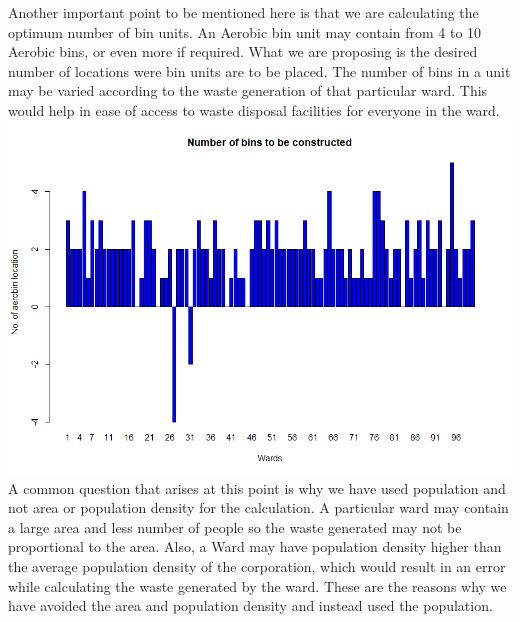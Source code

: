 \documentclass[12pt,a4paper]{  report}
\begin{document}
\begin{justify}
	Another important point to be mentioned here is that we are calculating the optimum number of bin units. An Aerobic bin unit may contain from 4 to 10 Aerobic bins, or even more if required. What we are proposing is the desired number of locations were bin units are to be placed. The number of bins in a unit may be varied according to the waste generation of that particular ward. This would help in ease of access to waste disposal facilities for everyone in the ward.
	\includegraphics[width=1\textwidth]{construc}
	A common question that arises at this point is why we have used population and not area or population density for the calculation. A particular ward may contain a large area and less number of people so the waste generated may not be proportional to the area. Also, a Ward may have population density higher than the average population density of the corporation, which would result in an error while calculating the waste generated by the ward. These are the reasons why we have avoided the area and population density and instead used the population.
	
\end{justify}
\end{document}

